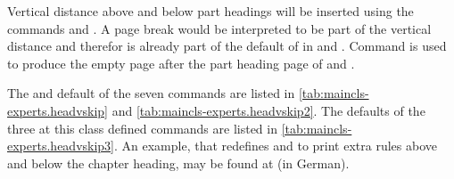 Vertical distance above and below part headings will be inserted using the
commands  and . A page break
would be interpreted to be part of the vertical distance and therefor is
already part of the default of  in
 and
. Command
 is used to produce the empty page after the part heading
page of  and .

The  and
 default of the seven commands are listed in
\autoref{tab:maincls-experts.headvskip} and
\autoref{tab:maincls-experts.headvskip2}. The
 defaults of the three at this class
defined commands are listed in
\autoref{tab:maincls-experts.headvskip3}. An example, that
redefines  and  to
print extra rules above and below the chapter heading, may be found at
\cite{homepage} (in German).%
%
